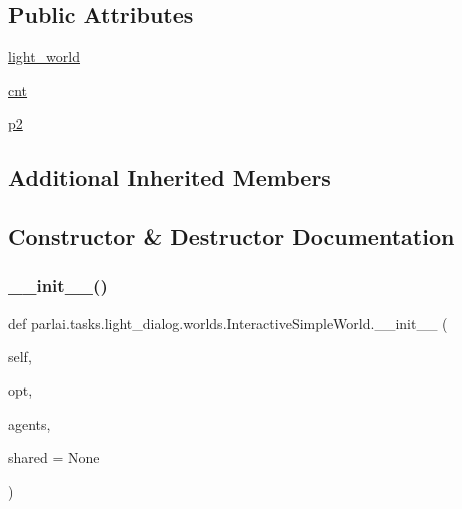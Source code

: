 \subsection*{Public Attributes}
\begin{DoxyCompactItemize}
\item 
\hyperlink{classparlai_1_1tasks_1_1light__dialog_1_1worlds_1_1InteractiveSimpleWorld_ac921ca4e82abbe89d74bac1647c81709}{light\+\_\+world}
\item 
\hyperlink{classparlai_1_1tasks_1_1light__dialog_1_1worlds_1_1InteractiveSimpleWorld_a5d42d18cbe9f2e6d632b4d1f9419ab1e}{cnt}
\item 
\hyperlink{classparlai_1_1tasks_1_1light__dialog_1_1worlds_1_1InteractiveSimpleWorld_a3eff26ccc2fcf05aefd085fcc32337d8}{p2}
\end{DoxyCompactItemize}
\subsection*{Additional Inherited Members}


\subsection{Constructor \& Destructor Documentation}
\mbox{\label{classparlai_1_1tasks_1_1light__dialog_1_1worlds_1_1InteractiveSimpleWorld_a4fdcb579f2f36ccbfc11118ce857b2e4}} 
\subsubsection{\texorpdfstring{\+\_\+\+\_\+init\+\_\+\+\_\+()}{\_\_init\_\_()}}
{\footnotesize\ttfamily def parlai.\+tasks.\+light\+\_\+dialog.\+worlds.\+Interactive\+Simple\+World.\+\_\+\+\_\+init\+\_\+\+\_\+ (\begin{DoxyParamCaption}\item[{}]{self,  }\item[{}]{opt,  }\item[{}]{agents,  }\item[{}]{shared = {\ttfamily None} }\end{DoxyParamCaption})}



